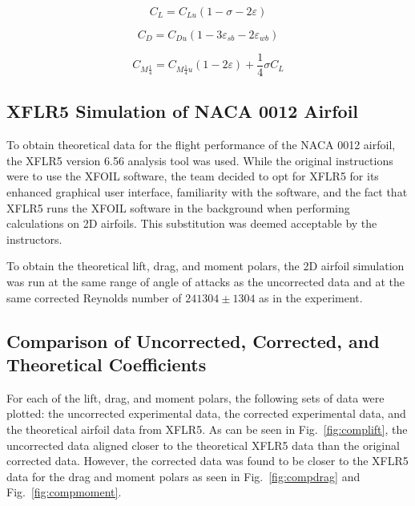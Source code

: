 \documentclass[journal,letterpaper]{IEEEtran}
\begin{document}
\begin{equation} \label{eq:liftu}
    C_L = C_{Lu} (1 - \sigma - 2\varepsilon)
\end{equation}

\begin{equation} \label{eq:dragu}
    C_D = C_{Du} (1 - 3\varepsilon_{sb} - 2\varepsilon_{wb})
\end{equation}

\begin{equation} \label{eq:Mu}
    C_{M\frac{1}{4}} = C_{M\frac{1}{4}u} (1 - 2\varepsilon) + \frac{1}{4}\sigma C_L  
\end{equation}

\subsection{XFLR5 Simulation of NACA 0012 Airfoil}

To obtain theoretical data for the flight performance of the NACA 0012 airfoil, the XFLR5 version 6.56 analysis tool was used.
While the original instructions were to use the XFOIL software, the team decided to opt for XFLR5 for its enhanced graphical user interface, familiarity with the software, and the fact that XFLR5 runs the XFOIL software in the background when performing calculations on 2D airfoils.
This substitution was deemed acceptable by the instructors.

To obtain the theoretical lift, drag, and moment polars, the 2D airfoil simulation was run at the same range of angle of attacks as the uncorrected data and at the same corrected Reynolds number of $241304 \pm 1304$ as in the experiment.

\subsection{Comparison of Uncorrected, Corrected, and Theoretical Coefficients}

For each of the lift, drag, and moment polars, the following sets of data were plotted: the uncorrected experimental data, the corrected experimental data, and the theoretical airfoil data from XFLR5.
As can be seen in Fig.~\ref{fig:complift}, the uncorrected data aligned closer to the theoretical XFLR5 data than the original corrected data.
However, the corrected data was found to be closer to the XFLR5 data for the drag and moment polars as seen in Fig.~\ref{fig:compdrag} and Fig.~\ref{fig:compmoment}. 
\end{document}
